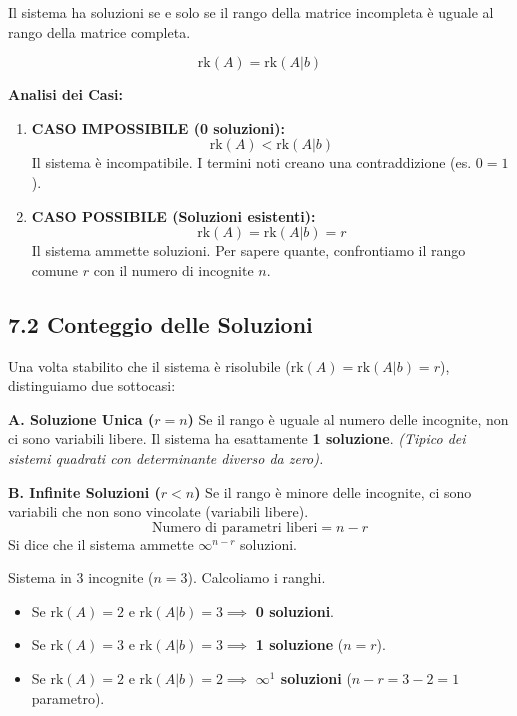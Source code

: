 \documentclass[10pt,a4paper]{article}
\begin{document}
\begin{tcolorbox}[colback=red!5!white,colframe=red!75!black,title=\textbf{TEOREMA DI ROUCHÉ-CAPELLI}]
Il sistema ha soluzioni se e solo se il rango della matrice incompleta è uguale al rango della matrice completa.

\[ \text{rk}(A) = \text{rk}(A|b) \]

\textbf{Analisi dei Casi:}
\begin{enumerate}
    \item \textbf{CASO IMPOSSIBILE (0 soluzioni):}
    \[ \text{rk}(A) < \text{rk}(A|b) \]
    Il sistema è incompatibile. I termini noti creano una contraddizione (es. $0=1$).
    
    \item \textbf{CASO POSSIBILE (Soluzioni esistenti):}
    \[ \text{rk}(A) = \text{rk}(A|b) = r \]
    Il sistema ammette soluzioni. Per sapere quante, confrontiamo il rango comune $r$ con il numero di incognite $n$.
\end{enumerate}
\end{tcolorbox}

\subsection*{7.2 Conteggio delle Soluzioni}
Una volta stabilito che il sistema è risolubile ($\text{rk}(A) = \text{rk}(A|b) = r$), distinguiamo due sottocasi:

\textbf{A. Soluzione Unica ($r = n$)}
Se il rango è uguale al numero delle incognite, non ci sono variabili libere.
Il sistema ha esattamente \textbf{1 soluzione}.
\textit{(Tipico dei sistemi quadrati con determinante diverso da zero).}

\textbf{B. Infinite Soluzioni ($r < n$)}
Se il rango è minore delle incognite, ci sono variabili che non sono vincolate (variabili libere).
\[ \text{Numero di parametri liberi} = n - r \]
Si dice che il sistema ammette $\infty^{n-r}$ soluzioni.

\vspace{0.3cm}
\begin{tcolorbox}[colback=yellow!10!white,colframe=orange!85!black,title=\textbf{Esempio Pratico}]
Sistema in 3 incognite ($n=3$). Calcoliamo i ranghi.
\begin{itemize}
    \item Se $\text{rk}(A)=2$ e $\text{rk}(A|b)=3 \implies$ \textbf{0 soluzioni}.
    \item Se $\text{rk}(A)=3$ e $\text{rk}(A|b)=3 \implies$ \textbf{1 soluzione} ($n=r$).
    \item Se $\text{rk}(A)=2$ e $\text{rk}(A|b)=2 \implies$ \textbf{$\infty^1$ soluzioni} ($n-r = 3-2 = 1$ parametro).
\end{itemize}
\end{tcolorbox}
\end{document}
